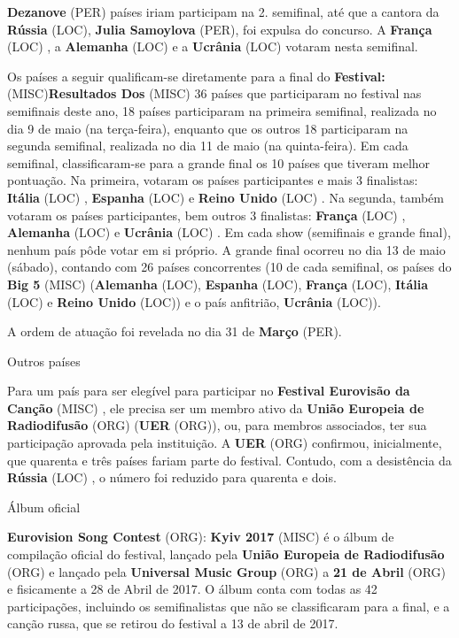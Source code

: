 \documentclass[12pt,a4paper]{article}
\begin{document}
\textbf{Dezanove} (PER) países iriam participam na 2. semifinal, até que a cantora da \textbf{Rússia} (LOC), \textbf{Julia Samoylova} (PER), foi expulsa do concurso. A \textbf{França} (LOC) , a \textbf{Alemanha} (LOC) e a \textbf{Ucrânia} (LOC) votaram nesta semifinal.

Os países a seguir qualificam-se diretamente para a final do \textbf{Festival:} (MISC)\textbf{Resultados Dos} (MISC) 36 países que participaram no festival nas semifinais deste ano, 18 países participaram na primeira semifinal, realizada no dia 9 de maio (na terça-feira), enquanto que os outros 18 participaram na segunda semifinal, realizada no dia 11 de maio (na quinta-feira). Em cada semifinal, classificaram-se para a grande final os 10 países que tiveram melhor pontuação. Na primeira, votaram os países participantes e mais 3 finalistas: \textbf{Itália} (LOC) , \textbf{Espanha} (LOC) e \textbf{Reino Unido} (LOC) . Na segunda, também votaram os países participantes, bem outros 3 finalistas: \textbf{França} (LOC) , \textbf{Alemanha} (LOC) e \textbf{Ucrânia} (LOC) . Em cada show (semifinais e grande final), nenhum país pôde votar em si próprio. A grande final ocorreu no dia 13 de maio (sábado), contando com 26 países concorrentes (10 de cada semifinal, os países do \textbf{Big 5} (MISC) (\textbf{Alemanha} (LOC), \textbf{Espanha} (LOC), \textbf{França} (LOC), \textbf{Itália} (LOC) e \textbf{Reino Unido} (LOC)) e o país anfitrião, \textbf{Ucrânia} (LOC)).

A ordem de atuação foi revelada no dia 31 de \textbf{Março} (PER).



Outros países

Para um país para ser elegível para participar no \textbf{Festival Eurovisão da Canção} (MISC) , ele precisa ser um membro ativo da \textbf{União Europeia de Radiodifusão} (ORG) (\textbf{UER} (ORG)), ou, para membros associados, ter sua participação aprovada pela instituição. A \textbf{UER} (ORG) confirmou, inicialmente, que quarenta e três países fariam parte do festival. Contudo, com a desistência da \textbf{Rússia} (LOC) , o número foi reduzido para quarenta e dois.



Álbum oficial

\textbf{Eurovision Song Contest} (ORG): \textbf{Kyiv 2017} (MISC) é o álbum de compilação oficial do festival, lançado pela \textbf{União Europeia de Radiodifusão} (ORG) e lançado pela \textbf{Universal Music Group} (ORG) a \textbf{21 de Abril} (ORG) e fisicamente a 28 de Abril de 2017. O álbum conta com todas as 42 participações, incluindo os semifinalistas que não se classificaram para a final, e a canção russa, que se retirou do festival a 13 de abril de 2017.
\end{document}
